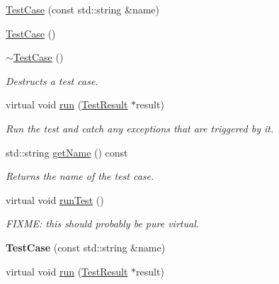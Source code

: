 \begin{DoxyCompactItemize}
\item 
\hyperlink{class_test_case_af81ee40f823e03175e2f2b965ff3661a}{Test\+Case} (const std\+::string \&name)
\item 
\hyperlink{class_test_case_ac62aa15cb45a40bdc0b9a1c6554c7e0a}{Test\+Case} ()
\item 
\hypertarget{class_test_case_ae4684f6b106fa323a61dd13be03d7919}{\hyperlink{class_test_case_ae4684f6b106fa323a61dd13be03d7919}{$\sim$\+Test\+Case} ()}\label{class_test_case_ae4684f6b106fa323a61dd13be03d7919}

\begin{DoxyCompactList}\small\item\em Destructs a test case. \end{DoxyCompactList}\item 
\hypertarget{class_test_case_ac3011d91e8a2d38162f72888d2ecafd7}{virtual void \hyperlink{class_test_case_ac3011d91e8a2d38162f72888d2ecafd7}{run} (\hyperlink{class_test_result}{Test\+Result} $\ast$result)}\label{class_test_case_ac3011d91e8a2d38162f72888d2ecafd7}

\begin{DoxyCompactList}\small\item\em Run the test and catch any exceptions that are triggered by it. \end{DoxyCompactList}\item 
\hypertarget{class_test_case_a833448555e5ce90d826f2b411f47ec3d}{std\+::string \hyperlink{class_test_case_a833448555e5ce90d826f2b411f47ec3d}{get\+Name} () const }\label{class_test_case_a833448555e5ce90d826f2b411f47ec3d}

\begin{DoxyCompactList}\small\item\em Returns the name of the test case. \end{DoxyCompactList}\item 
virtual void \hyperlink{class_test_case_ab366c8f5cf50af8c3fa69812c5ad5b50}{run\+Test} ()
\begin{DoxyCompactList}\small\item\em F\+I\+X\+M\+E\+: this should probably be pure virtual. \end{DoxyCompactList}\item 
\hypertarget{class_test_case_af81ee40f823e03175e2f2b965ff3661a}{{\bfseries Test\+Case} (const std\+::string \&name)}\label{class_test_case_af81ee40f823e03175e2f2b965ff3661a}

\item 
\hypertarget{class_test_case_a6bc50d62de5b2d0addf9b0167e34b134}{virtual void \hyperlink{class_test_case_a6bc50d62de5b2d0addf9b0167e34b134}{run} (\hyperlink{class_test_result}{Test\+Result} $\ast$result)}\label{class_test_case_a6bc50d62de5b2d0addf9b0167e34b134}


\end{DoxyCompactItemize}
